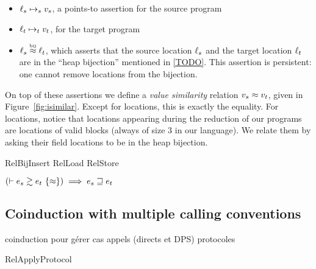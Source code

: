 \begin{itemize}
\item $\datalangLoc_s \iPointsto_s \datalangVal_s$, a points-to assertion for the source program
\item $\datalangLoc_t \iPointsto_t \datalangVal_t$, for the target program
\item $\datalangLoc_s \iInBij \datalangLoc_t$, which asserts that the source location
  $\datalangLoc_s$ and the target location $\datalangLoc_t$ are in the ``heap
  bijection'' mentioned in \cref{TODO}. This assertion is
  persistent: one cannot remove locations from the bijection.
\end{itemize}

On top of these assertions we define a \emph{value similarity} relation $\datalangVal_s \iSimilar \datalangVal_t$, given in Figure~\ref{fig:isimilar}.  Except for locations, this is exactly the equality. For locations, notice that locations appearing during the reduction of our programs are locations of valid blocks (always of size 3 in our language). We relate them by asking their field locations to be in the heap bijection.


RelBijInsert
RelLoad
RelStore

\begin{theorem}[Adequacy]
    $
        \left( \vdash \iSimv{\iSimilar}{\datalangExpr_s}{\datalangExpr_t} \right) \implies
        \datalangExpr_s \refined \datalangExpr_t
    $
\end{theorem}




\subsection{Coinduction with multiple calling conventions}

coinduction pour gérer cas appels (directs et DPS)
protocoles

RelApplyProtocol

